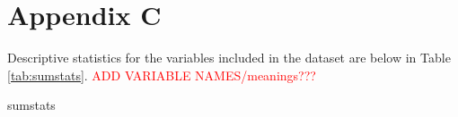 \documentclass[class=article, crop=false]{standalone}
\begin{document}
\section{Appendix C}
\label{sec:appendixC}
Descriptive statistics for the variables included in the dataset are below in Table \ref{tab:sumstats}. \textcolor{red}{ADD VARIABLE NAMES/meanings???}

{sumstats}

\ifstandalone

\fi
\end{document}

